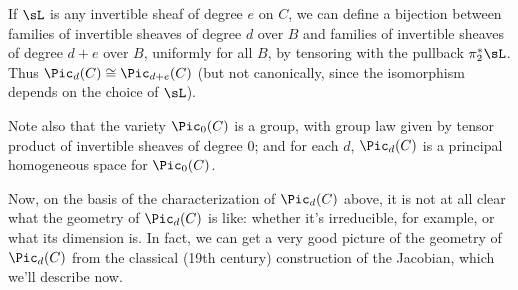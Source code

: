 If $\sL$ is any invertible sheaf of degree $e$ on $C$, we can define a bijection between families of invertible sheaves of degree $d$ over $B$ and families of invertible sheaves of degree $d+e$ over $B$, uniformly for all $B$, by tensoring with the pullback $\pi_2^*\sL$. Thus $\Pic_d(C) \cong \Pic_{d+e}(C)$ (but not canonically, since the isomorphism depends on the choice of $\sL$).
 
 Note also that the variety $\Pic_0(C)$ is a group, with group law given by tensor product of invertible sheaves of degree 0; and for each $d$, $\Pic_d(C)$ is a principal homogeneous space for $\Pic_0(C)$. 
 
 
 Now, on the basis of the characterization of $\Pic_d(C)$ above, it is not at all clear what the geometry of $\Pic_d(C)$ is like: whether it's irreducible, for example, or what its dimension is. In fact, we can get a very good picture of the geometry of $\Pic_d(C)$ from the classical (19th century) construction of the Jacobian, which we'll describe now.
 
%
%
%

